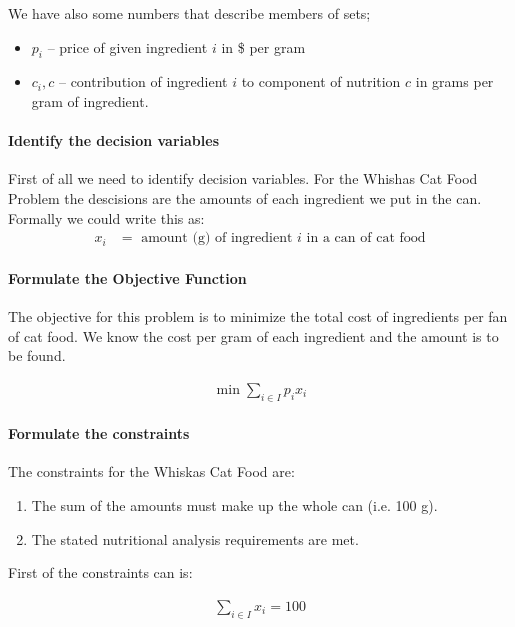 We have also some numbers that describe members of sets;
\begin{itemize}
  \item $p_i$ -- price of given ingredient $i$ in \$ per gram
  \item $c_i,c$ -- contribution of ingredient $i$ to component of nutrition $c$ in grams per gram of ingredient.
\end{itemize}

\paragraph{Identify the decision variables}

First of all we need to identify decision variables. For the Whishas Cat Food Problem the descisions are the amounts of each ingredient we put in the can. Formally we could write this as:
\begin{align} 
  x_i &= \text{ amount (g) of ingredient $i$  in a can of cat food}
\end{align} 

\paragraph{Formulate the Objective Function}

The objective for this problem is to minimize the total cost of ingredients per fan of cat food. We know the cost per gram of each ingredient and the amount is to be found.

\begin{align}
   \min \mathop\sum\limits_{i \in I} p_i x_i
\end{align}

\paragraph{Formulate the constraints}

The constraints for the Whiskas Cat Food are:

\begin{enumerate}
  \item The sum of the amounts must make up the whole can (i.e. 100 g).
  \item The stated nutritional analysis requirements are met.
\end{enumerate}

First of the constraints can is: 

\begin{align}
   \mathop\sum\limits_{i \in I} x_i = 100
\end{align}

